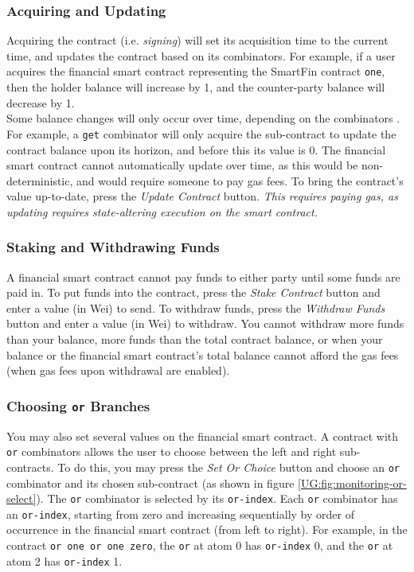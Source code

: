 \subsubsection{Acquiring and Updating}

Acquiring the contract (i.e. \textit{signing}) will set its acquisition time to the current time, and updates the contract based on its combinators. For example, if a user acquires the financial smart contract representing the SmartFin contract \texttt{one}, then the holder balance will increase by 1, and the counter-party balance will decrease by 1. \\

Some balance changes will only occur over time, depending on the combinators . For example, a \texttt{get} combinator will only acquire the sub-contract to update the contract balance upon its horizon, and before this its value is 0. The financial smart contract cannot automatically update over time, as this would be non-deterministic, and would require someone to pay gas fees. To bring the contract's value up-to-date, press the \textit{Update Contract} button. \textit{This requires paying gas, as updating requires state-altering execution on the smart contract.}


\subsubsection{Staking and Withdrawing Funds}

A financial smart contract cannot pay funds to either party until some funds are paid in. To put funds into the contract, press the \textit{Stake Contract} button and enter a value (in Wei) to send. To withdraw funds, press the \textit{Withdraw Funds} button and enter a value (in Wei) to withdraw. You cannot withdraw more funds than your balance, more funds than the total contract balance, or when your balance or the financial smart contract's total balance cannot afford the gas fees (when gas fees upon withdrawal are enabled).


\subsubsection{Choosing \texttt{or} Branches} \label{UG:or-branches}

You may also set several values on the financial smart contract. A contract with \texttt{or} combinators allows the user to choose between the left and right sub-contracts. To do this, you may press the \textit{Set Or Choice} button and choose an \texttt{or} combinator and its chosen sub-contract (as shown in figure \ref{UG:fig:monitoring-or-select}). The \texttt{or} combinator is selected by its \texttt{or-index}. Each \texttt{or} combinator has an \texttt{or-index}, starting from zero and increasing sequentially by order of occurrence in the financial smart contract (from left to right). For example, in the contract \texttt{or one or one zero}, the \texttt{or} at atom 0 has \texttt{or-index} 0, and the \texttt{or} at atom 2 has \texttt{or-index} 1.

